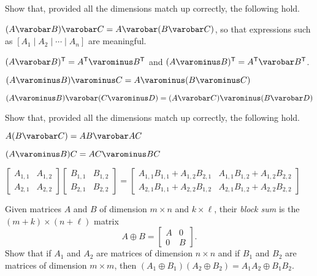 \begin{exercises}
\ResumeExercises
\item{\label{exr:concatenation}}
Show that, provided all the dimensions match up correctly, the following hold.
\begin{enumerate*}
\item $(A \varobar B) \varobar C = A \varobar (B \varobar C)$, so that expressions such as $[A_1 \mid A_2 \mid \cdots \mid A_n]$ are meaningful.
\item $(A \varobar B)^\mathsf{T} = A^\mathsf{T} \varominus B^\mathsf{T}$ and $(A \varominus B)^\mathsf{T} = A^\mathsf{T} \varobar B^\mathsf{T}$.
\item $(A \varominus B) \varominus C = A \varominus (B \varominus C)$
\item $(A \varominus B) \varobar (C \varominus D) = (A \varobar C) \varominus (B \varobar D)$
\end{enumerate*}

\item Show that, provided all the dimensions match up correctly, the following hold.
\begin{enumerate*}
\item $A(B \varobar C) = AB \varobar AC$
\item $(A \varominus B)C = AC \varominus BC$
\item $\left[\begin{array}{c|c} A_{1,1} & A_{1,2} \\ \hline A_{2,1} & A_{2,2} \end{array}\right] \left[\begin{array}{c|c} B_{1,1} & B_{1,2} \\ \hline B_{2,1} & B_{2,2} \end{array}\right] = \left[\begin{array}{c|c} A_{1,1}B_{1,1} + A_{1,2}B_{2,1} & A_{1,1}B_{1,2} + A_{1,2}B_{2,2} \\ \hline A_{2,1}B_{1,1} + A_{2,2}B_{1,2} & A_{2,1}B_{1,2} + A_{2,2}B_{2,2} \end{array}\right]$
\end{enumerate*}

\item Given matrices $A$ and $B$ of dimension $m \times n$ and $k \times \ell$, their \emph{block sum} is the $(m+k) \times (n+\ell)$ matrix \[A \oplus B = \left[ \begin{array}{c|c} A & 0 \\ \hline 0 & B \end{array}\right]. \] Show that if $A_1$ and $A_2$ are matrices of dimension $n \times n$ and if $B_1$ and $B_2$ are matrices of dimension $m \times m$, then $(A_1 \oplus B_1)(A_2 \oplus B_2) = A_1A_2 \oplus B_1B_2$.
\PauseExercises
\end{exercises}

